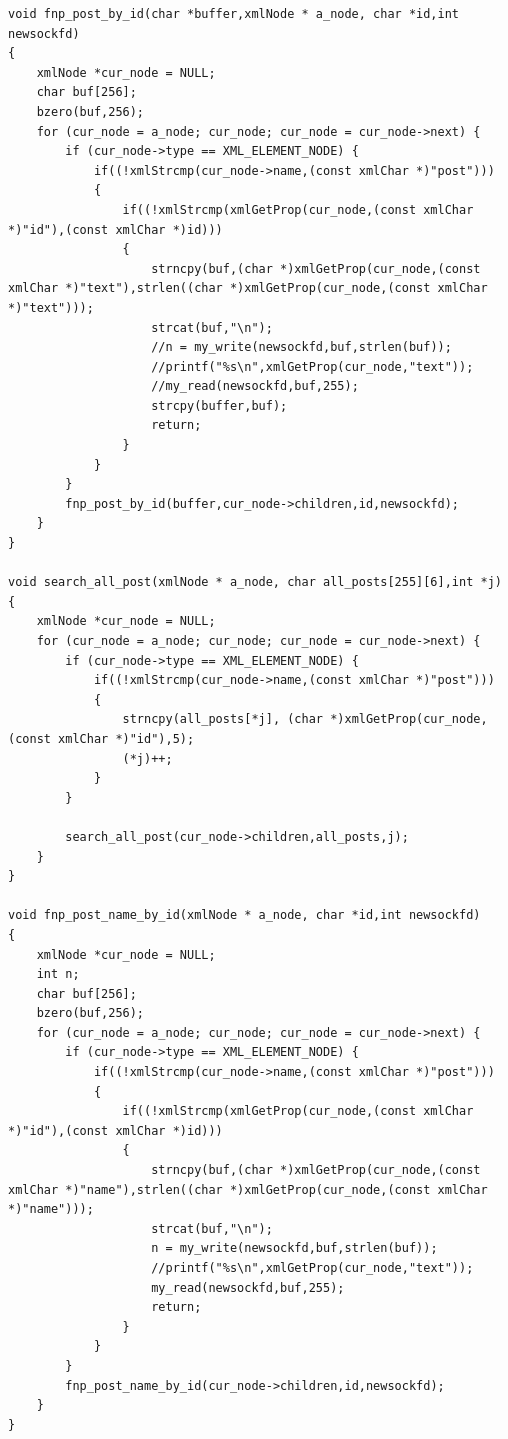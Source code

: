 \documentclass[10pt,a4paper]{report}
\begin{document}
\begin{verbatim}
void fnp_post_by_id(char *buffer,xmlNode * a_node, char *id,int newsockfd)
{
    xmlNode *cur_node = NULL;
    char buf[256];
    bzero(buf,256);
    for (cur_node = a_node; cur_node; cur_node = cur_node->next) {
        if (cur_node->type == XML_ELEMENT_NODE) {
            if((!xmlStrcmp(cur_node->name,(const xmlChar *)"post")))
            {
                if((!xmlStrcmp(xmlGetProp(cur_node,(const xmlChar *)"id"),(const xmlChar *)id)))
                {
                    strncpy(buf,(char *)xmlGetProp(cur_node,(const xmlChar *)"text"),strlen((char *)xmlGetProp(cur_node,(const xmlChar *)"text")));
                    strcat(buf,"\n");
                    //n = my_write(newsockfd,buf,strlen(buf));
                    //printf("%s\n",xmlGetProp(cur_node,"text"));
                    //my_read(newsockfd,buf,255);
                    strcpy(buffer,buf);
                    return;
                }
            }
        }
        fnp_post_by_id(buffer,cur_node->children,id,newsockfd);
    }
}

void search_all_post(xmlNode * a_node, char all_posts[255][6],int *j)
{
    xmlNode *cur_node = NULL;
    for (cur_node = a_node; cur_node; cur_node = cur_node->next) {
        if (cur_node->type == XML_ELEMENT_NODE) {
            if((!xmlStrcmp(cur_node->name,(const xmlChar *)"post")))
            {
                strncpy(all_posts[*j], (char *)xmlGetProp(cur_node,(const xmlChar *)"id"),5);
                (*j)++;
            }
        }

        search_all_post(cur_node->children,all_posts,j);
    }
}

void fnp_post_name_by_id(xmlNode * a_node, char *id,int newsockfd)
{
    xmlNode *cur_node = NULL;
    int n;
    char buf[256];
    bzero(buf,256);
    for (cur_node = a_node; cur_node; cur_node = cur_node->next) {
        if (cur_node->type == XML_ELEMENT_NODE) {
            if((!xmlStrcmp(cur_node->name,(const xmlChar *)"post")))
            {
                if((!xmlStrcmp(xmlGetProp(cur_node,(const xmlChar *)"id"),(const xmlChar *)id)))
                {
                    strncpy(buf,(char *)xmlGetProp(cur_node,(const xmlChar *)"name"),strlen((char *)xmlGetProp(cur_node,(const xmlChar *)"name")));
                    strcat(buf,"\n");
                    n = my_write(newsockfd,buf,strlen(buf));
                    //printf("%s\n",xmlGetProp(cur_node,"text"));
                    my_read(newsockfd,buf,255);
                    return;
                }
            }
        }
        fnp_post_name_by_id(cur_node->children,id,newsockfd);
    }
}


\end{verbatim}
\end{document}
